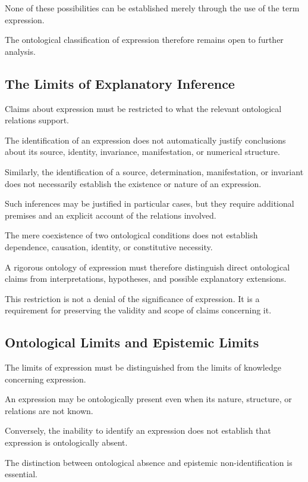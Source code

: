 None of these possibilities can be established
merely through the use of the term expression.

The ontological classification of expression
therefore remains open to further analysis.

\subsection{The Limits of Explanatory Inference}

Claims about expression must be restricted to
what the relevant ontological relations support.

The identification of an expression does not
automatically justify conclusions about its source,
identity, invariance, manifestation, or numerical
structure.

Similarly, the identification of a source,
determination, manifestation, or invariant does
not necessarily establish the existence or nature
of an expression.

Such inferences may be justified in particular
cases, but they require additional premises
and an explicit account of the relations involved.

The mere coexistence of two ontological conditions
does not establish dependence, causation, identity,
or constitutive necessity.

A rigorous ontology of expression must therefore
distinguish direct ontological claims from
interpretations, hypotheses, and possible
explanatory extensions.

This restriction is not a denial of the significance
of expression. It is a requirement for preserving
the validity and scope of claims concerning it.

\subsection{Ontological Limits and Epistemic Limits}

The limits of expression must be distinguished
from the limits of knowledge concerning expression.

An expression may be ontologically present even
when its nature, structure, or relations are not
known.

Conversely, the inability to identify an expression
does not establish that expression is ontologically
absent.

The distinction between ontological absence and
epistemic non-identification is essential.


